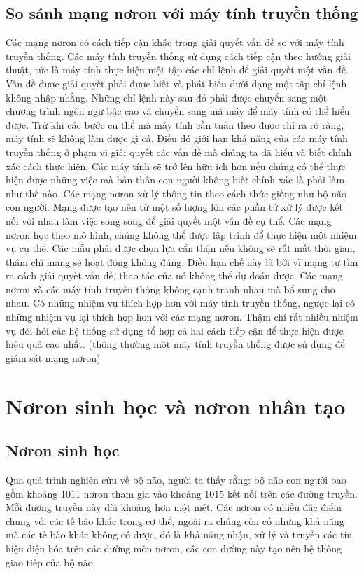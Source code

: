 \subsection{So sánh mạng nơron với máy tính truyền thống}
Các mạng nơron có cách tiếp cận khác trong giải quyết vấn đề so với máy tính truyền thống. Các máy tính truyền thống sử dụng cách tiếp cận theo hướng giải thuật, tức là máy tính thực hiện một tập các chỉ lệnh để giải quyết một vấn đề. Vấn đề được giải quyết phải được biết và phát biểu dưới dạng một tập chỉ lệnh không nhập nhằng. Những chỉ lệnh này sau đó phải được chuyển sang một chương trình ngôn ngữ bậc cao và chuyển sang mã máy để máy tính có thể hiểu được. 
Trừ khi các bước cụ thể mà máy tính cần tuân theo được chỉ ra rõ ràng, máy tính sẽ không làm được gì cả. Điều đó giới hạn khả năng của các máy tính truyền thống ở phạm vi giải quyết các vấn đề mà chúng ta đã hiểu và biết chính xác cách thực hiện. Các máy tính sẽ trở lên hữu ích hơn nếu chúng có thể thực hiện được những việc mà bản thân con người không biết chính xác là phải làm như thế nào. 
Các mạng nơron xử lý thông tin theo cách thức giống như bộ não con người. Mạng được tạo nên từ một số lượng lớn các phần tử xử lý được kết nối với nhau làm việc song song để giải quyết một vấn đề cụ thể. Các mạng nơron học theo mô hình, chúng không thể được lập trình để thực hiện một nhiệm vụ cụ thể. Các mẫu phải được chọn lựa cẩn thận nếu không sẽ rất mất thời gian, thậm chí mạng sẽ hoạt động không đúng. Điều hạn chế này là bởi vì mạng tự tìm ra cách giải quyết vấn đề, thao tác của nó không thể dự đoán được. 
Các mạng nơron và các máy tính truyền thống không cạnh tranh nhau mà bổ sung cho nhau. Có những nhiệm vụ thích hợp hơn với máy tính truyền thống, ngược lại có những nhiệm vụ lại thích hợp hơn với các mạng nơron. Thậm chí rất nhiều nhiệm vụ đòi hỏi các hệ thống sử dụng tổ hợp cả hai cách tiếp cận để thực hiện được hiệu quả cao nhất. (thông thường một máy tính truyền thống được sử dụng để giám sát mạng nơron)

\section{Nơron sinh học và nơron nhân tạo}
\subsection{Nơron sinh học}
Qua quá trình nghiên cứu về bộ não, người ta thấy rằng: bộ não con người bao gồm khoảng 1011 nơron tham gia vào khoảng 1015 kết nối trên các đường truyền. Mỗi đường truyền này dài khoảng hơn một mét. Các nơron có nhiều đặc điểm chung với các tế bào khác trong cơ thể, ngoài ra chúng còn có những khả năng mà các tế bào khác không có được, đó là khả năng nhận, xử lý và truyền các tín hiệu điện hóa trên các đường mòn nơron, các con đường này tạo nên hệ thống giao tiếp của bộ não.

